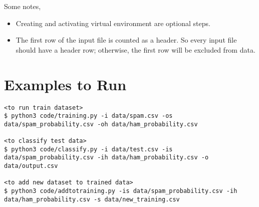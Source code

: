 \documentclass[twoside,10pt]{article}
\begin{document}
Some notes,

\begin{itemize}
    \itemsep1pt\parskip0pt
    \item Creating and activating virtual environment are optional steps.
    \item The first row of the input file is counted as a header. So every input file should have a header row; otherwise, the first row will be excluded from data.
\end{itemize}

\section*{Examples to Run}\label{examples-to-run}
\begin{lstlisting}[breaklines]
<to run train dataset>
$ python3 code/training.py -i data/spam.csv -os data/spam_probability.csv -oh data/ham_probability.csv

<to classify test data>
$ python3 code/classify.py -i data/test.csv -is data/spam_probability.csv -ih data/ham_probability.csv -o data/output.csv

<to add new dataset to trained data>
$ python3 code/addtotraining.py -is data/spam_probability.csv -ih data/ham_probability.csv -s data/new_training.csv
    
\end{lstlisting}
\end{document}

